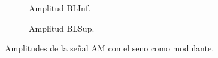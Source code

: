       \begin{figure}[H]
        \centering
        \begin{subfigure}[H]{0.48\textwidth}
          \caption{Amplitud BLInf.}
          \label{fig:AmplitudBLInfAMSeno}
        \end{subfigure}
        \hfill 
        \begin{subfigure}[H]{0.48\textwidth}
          \caption{Amplitud BLSup.}
          \label{fig:AmpltiudBLSupAMSeno}
        \end{subfigure}
      
        \caption{Amplitudes de la señal AM con el seno como modulante.}
        \label{fig:AmplitudesAMSeno}
      \end{figure}


